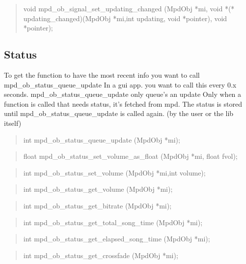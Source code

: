 \documentclass[a4paper,11pt]{article}
\begin{document}
\begin{quote}
void   mpd\_ob\_signal\_set\_updating\_changed 
(MpdObj *mi, void *(* updating\_changed)(MpdObj *mi,int updating, void *pointer), 
void *pointer);
\end{quote}



\subsection{Status}


To get the function to have the  most recent info you want to call mpd\_ob\_status\_queue\_update 
In a gui app. you want to call this every 0.x seconds. 
mpd\_ob\_status\_queue\_update only queue's an update
Only when a function is called that needs status, it's fetched from mpd.
The status is stored until mpd\_ob\_status\_queue\_update is called again. (by the user or the lib itself)

\begin{quote}
int   mpd\_ob\_status\_queue\_update  (MpdObj *mi);
\end{quote}

\begin{quote}
float   mpd\_ob\_status\_set\_volume\_as\_float (MpdObj *mi, float fvol);
\end{quote}

\begin{quote}
int   mpd\_ob\_status\_set\_volume  (MpdObj *mi,int volume);
\end{quote}

\begin{quote}
int   mpd\_ob\_status\_get\_volume  (MpdObj *mi);
\end{quote}

\begin{quote}
int   mpd\_ob\_status\_get\_bitrate  (MpdObj *mi);
\end{quote}

\begin{quote}
int  mpd\_ob\_status\_get\_total\_song\_time (MpdObj *mi);
\end{quote}

\begin{quote}
int  mpd\_ob\_status\_get\_elapsed\_song\_time (MpdObj *mi);
\end{quote}

\begin{quote}
int  mpd\_ob\_status\_get\_crossfade  (MpdObj *mi);
\end{quote}
\end{document}
